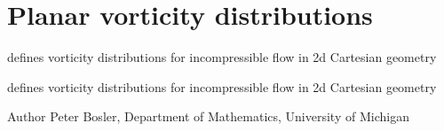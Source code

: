 \hypertarget{group__PlaneVorticity}{\section{Planar vorticity distributions}
\label{group__PlaneVorticity}
}


defines vorticity distributions for incompressible flow in 2d Cartesian geometry  


defines vorticity distributions for incompressible flow in 2d Cartesian geometry 

\begin{DoxyAuthor}{Author}
Peter Bosler, Department of Mathematics, University of Michigan 
\end{DoxyAuthor}

